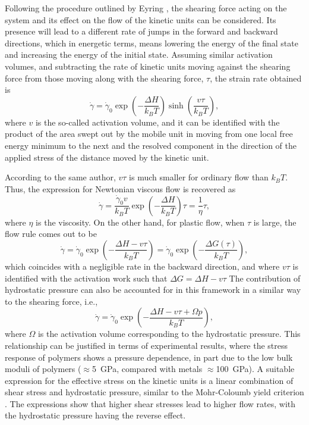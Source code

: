 Following the procedure outlined by Eyring \citep{eyringViscosityPlasticityDiffusion1936}, the shearing force acting on the system and its effect on the flow of the kinetic units can be considered.
Its presence will lead to a different rate of jumps in the forward and backward directions, which in energetic terms, means lowering the energy of the final state and increasing the energy of the initial state.
Assuming similar activation volumes, and subtracting the rate of kinetic units moving against the shearing force from those moving along with the shearing force, $\tau$, the strain rate obtained is
\begin{equation}
	\label{eq:eyring_model}
	\dot \gamma = \dot\gamma_0 \exp\left(-\frac{\Delta H}{k_BT}\right)\sinh\left(\frac{v\tau}{k_BT}\right),
\end{equation}
where $v$ is the so-called activation volume, and it can be identified with the product of the area swept out by the mobile unit in moving from one local free energy minimum to the next and the resolved component in the direction of the applied stress of the distance moved by the kinetic unit.

According to the same author, $v\tau$ is much smaller for ordinary flow than $k_B T$.
Thus, the expression for Newtonian viscous flow is recovered as
\begin{equation}
  \label{eq:newton_fluid_flow_rule_scalar}
	\dot \gamma = \frac{\dot \gamma_0 v}{k_B T}\exp\left(-\frac{\Delta H}{k_BT}\right)\tau=\frac{1}{\eta}\tau,
\end{equation}
where $\eta$ is the viscosity.
On the other hand, for plastic flow, when $\tau$ is large, the flow rule comes out to be
\begin{equation}
\label{eq:flow_rule_thermally_activated}
	\dot\gamma = \dot \gamma_0 \exp\left(-\frac{\Delta H - v \tau}{k_B T}\right)=\dot \gamma_0 \exp\left(-\frac{\Delta G(\tau)}{k_B T}\right),
\end{equation}
which coincides with a negligible rate in the backward direction, and where $v\tau$ is identified with the activation work such that $\Delta G = \Delta H - v\tau$
The contribution of hydrostatic pressure can also be accounted for in this framework in a similar way to the shearing force, i.e.,
\begin{equation}
  \label{eq:eyring_w_pressure}
	\dot\gamma = \dot\gamma_0 \exp\left(-\frac{\Delta H - v \tau + \Omega p}{k_B T}\right),
\end{equation}
where $\Omega$ is the activation volume corresponding to the hydrostatic pressure.
This relationship can be justified in terms of experimental results, where the stress response of polymers shows a pressure dependence, in part due to the low bulk moduli of polymers ($\approx$\SI{5}{\giga\pascal}, compared with metals $\approx$\SI{100}{\giga\pascal}).
A suitable expression for the effective stress on the kinetic units is a linear combination of shear stress and hydrostatic pressure, similar to the Mohr-Coloumb yield criterion \citep{wardIntroductionMechanicalProperties2004}.
The expressions show that higher shear stresses lead to higher flow rates, with the hydrostatic pressure having the reverse effect.

